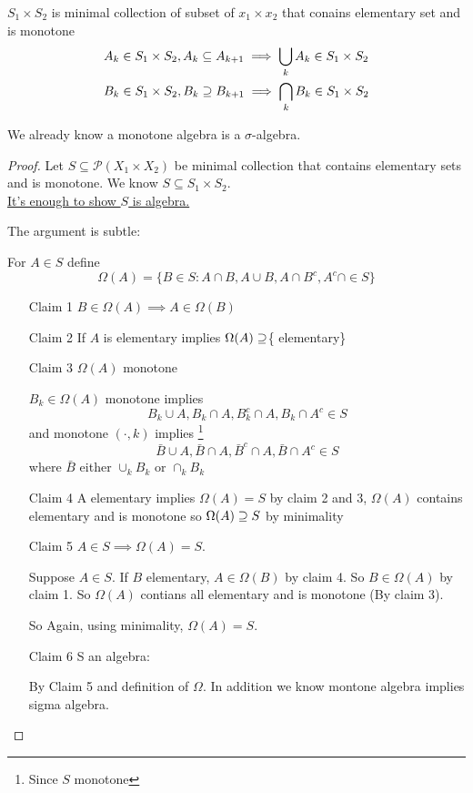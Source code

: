 \begin{lemma}
	$S_1 \times S_2$ is minimal collection of subset of $x_1 \times x_2$ that conains elementary set and is monotone
	\begin{align}
		&A_k \in S_1 \times S_2, A_k \subseteq A_{k+1} \implies \bigcup_{k}A_{k} \in S_1 \times S_2 \\
		&B_k \in S_1 \times S_2, B_k \supseteq B_{k+1} \implies \bigcap_{k}B_{k} \in S_1 \times S_2 \\
	\end{align}
\end{lemma}

\begin{remark}
	We already know a monotone algebra is a $\sigma$-algebra.
\end{remark}

\begin{proof}
	Let $S \subseteq \mathcal{P}(X_1 \times X_2)$ be minimal collection that contains elementary sets and is monotone.
	We know $S \subseteq S_1 \times S_2.$ \\
	\underline{It's enough to show $S$ is algebra.}

	The argument is subtle:

	For $A \in S$ define
	\[
		\Omega (A) = \{ B \in S : A \cap B, A \cup B, A \cap B^c, A^c \cap \in S\}
	\] 
	\begin{enumerate}
		\item[Claim 1] $B \in \Omega (A) \implies A \in \Omega (B)$
		\item[Claim 2]  If $A$ is elementary implies $\Omega (A) \supseteq$\{ elementary\}
		\item[Claim 3] $\Omega (A)$ monotone

			$B_{k} \in \Omega (A) $ monotone implies
			\[
				B_{k} \cup A, B_k \cap A, B_{k}^c \cap A, B_k \cap A^c \in S
			\] and monotone $(\cdot, k)$ implies
			\footnote{Since $S$ monotone}
			\[
				\bar{B} \cup A, \bar{B} \cap A, \bar{B}^c \cap A, \bar{B} \cap A^c \in S
			\] where $\bar{B}$ either $\cup_{k} B_k$ or $\cap_{k} B_k$

		\item[Claim 4] A elementary implies $\Omega(A) = S$ by claim 2 and 3, $\Omega (A)$ contains elementary and is monotone so $\Omega (A) \supseteq S$ by minimality
		\item[Claim 5] $A \in S \implies \Omega (A) = S$.

			Suppose $A \in S$. If $B$ elementary, $A \in \Omega (B)$ by claim 4. So $B \in \Omega (A)$ by claim 1. So $\Omega (A)$ contians all elementary and is monotone (By claim 3).

			So Again, using minimality, $\Omega (A) = S$.
		\item[Claim 6] S an algebra:

			By Claim 5 and definition of  $\Omega$. In addition we know montone algebra implies sigma algebra.
 	\end{enumerate}
\end{proof}

